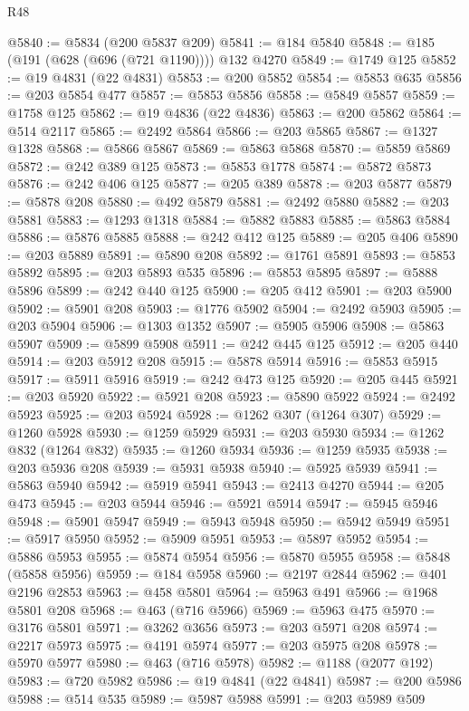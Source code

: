 \begin{lexlean}{R48}
\begin{coremodule}
@5840 := @5834 (@200 @5837 @209)
@5841 := @184 @5840
@5848 := @185 (@191 (@628 (@696 (@721 @1190)))) @132 @4270
@5849 := @1749 @125
@5852 := @19 @4831 (@22 @4831)
@5853 := @200 @5852
@5854 := @5853 @635
@5856 := @203 @5854 @477
@5857 := @5853 @5856
@5858 := @5849 @5857
@5859 := @1758 @125
@5862 := @19 @4836 (@22 @4836)
@5863 := @200 @5862
@5864 := @514 @2117
@5865 := @2492 @5864
@5866 := @203 @5865
@5867 := @1327 @1328
@5868 := @5866 @5867
@5869 := @5863 @5868
@5870 := @5859 @5869
@5872 := @242 @389 @125
@5873 := @5853 @1778
@5874 := @5872 @5873
@5876 := @242 @406 @125
@5877 := @205 @389
@5878 := @203 @5877
@5879 := @5878 @208
@5880 := @492 @5879
@5881 := @2492 @5880
@5882 := @203 @5881
@5883 := @1293 @1318
@5884 := @5882 @5883
@5885 := @5863 @5884
@5886 := @5876 @5885
@5888 := @242 @412 @125
@5889 := @205 @406
@5890 := @203 @5889
@5891 := @5890 @208
@5892 := @1761 @5891
@5893 := @5853 @5892
@5895 := @203 @5893 @535
@5896 := @5853 @5895
@5897 := @5888 @5896
@5899 := @242 @440 @125
@5900 := @205 @412
@5901 := @203 @5900
@5902 := @5901 @208
@5903 := @1776 @5902
@5904 := @2492 @5903
@5905 := @203 @5904
@5906 := @1303 @1352
@5907 := @5905 @5906
@5908 := @5863 @5907
@5909 := @5899 @5908
@5911 := @242 @445 @125
@5912 := @205 @440
@5914 := @203 @5912 @208
@5915 := @5878 @5914
@5916 := @5853 @5915
@5917 := @5911 @5916
@5919 := @242 @473 @125
@5920 := @205 @445
@5921 := @203 @5920
@5922 := @5921 @208
@5923 := @5890 @5922
@5924 := @2492 @5923
@5925 := @203 @5924
@5928 := @1262 @307 (@1264 @307)
@5929 := @1260 @5928
@5930 := @1259 @5929
@5931 := @203 @5930
@5934 := @1262 @832 (@1264 @832)
@5935 := @1260 @5934
@5936 := @1259 @5935
@5938 := @203 @5936 @208
@5939 := @5931 @5938
@5940 := @5925 @5939
@5941 := @5863 @5940
@5942 := @5919 @5941
@5943 := @2413 @4270
@5944 := @205 @473
@5945 := @203 @5944
@5946 := @5921 @5914
@5947 := @5945 @5946
@5948 := @5901 @5947
@5949 := @5943 @5948
@5950 := @5942 @5949
@5951 := @5917 @5950
@5952 := @5909 @5951
@5953 := @5897 @5952
@5954 := @5886 @5953
@5955 := @5874 @5954
@5956 := @5870 @5955
@5958 := @5848 (@5858 @5956)
@5959 := @184 @5958
@5960 := @2197 @2844
@5962 := @401 @2196 @2853
@5963 := @458 @5801
@5964 := @5963 @491
@5966 := @1968 @5801 @208
@5968 := @463 (@716 @5966)
@5969 := @5963 @475
@5970 := @3176 @5801
@5971 := @3262 @3656
@5973 := @203 @5971 @208
@5974 := @2217 @5973
@5975 := @4191 @5974
@5977 := @203 @5975 @208
@5978 := @5970 @5977
@5980 := @463 (@716 @5978)
@5982 := @1188 (@2077 @192)
@5983 := @720 @5982
@5986 := @19 @4841 (@22 @4841)
@5987 := @200 @5986
@5988 := @514 @535
@5989 := @5987 @5988
@5991 := @203 @5989 @509

\end{coremodule}
\end{lexlean}
